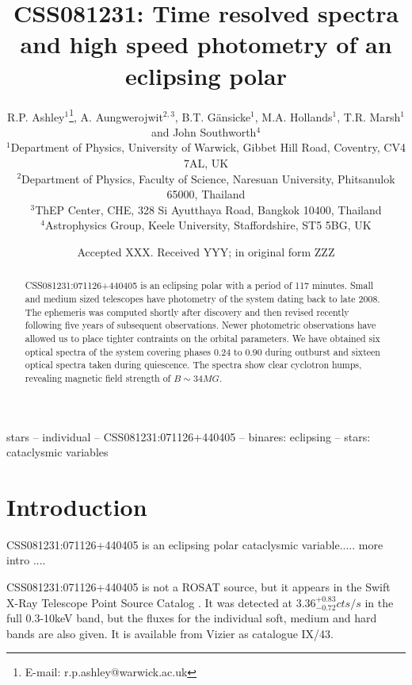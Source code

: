 \documentclass[a4paper,fleqn,usenatbib]{mnras}
\title[CSS081231]{CSS081231: Time resolved spectra and high speed photometry of an eclipsing polar}
\author[R.P. Ashley et al.]{
R.P. Ashley$^{1}$\thanks{E-mail: r.p.ashley@warwick.ac.uk},
A. Aungwerojwit$^{2, 3}$,
B.T. G{\"a}nsicke$^{1}$,
M.A. Hollands$^{1}$,
T.R. Marsh$^{1}$ and \newauthor
John Southworth$^{4}$
\\
$^{1}$Department of Physics, University of Warwick, Gibbet Hill Road, Coventry, CV4 7AL, UK\\
$^{2}$Department of Physics, Faculty of Science, Naresuan University, Phitsanulok 65000, Thailand\\
$^{3}$ThEP Center, CHE, 328 Si Ayutthaya Road, Bangkok 10400, Thailand\\
$^{4}$Astrophysics Group, Keele University, Staffordshire, ST5 5BG, UK
}
\date{Accepted XXX. Received YYY; in original form ZZZ}
\begin{document}
\label{firstpage}
\pagerange{\pageref{firstpage}--\pageref{lastpage}}
\maketitle

\begin{abstract}
CSS081231:071126+440405 is an eclipsing polar with a period of 117 minutes. Small and medium sized telescopes have photometry of the system dating back to late 2008. The ephemeris was computed shortly after discovery and then revised recently following five years of subsequent observations. Newer photometric observations have allowed us to place tighter contraints on the orbital parameters. We have obtained six optical spectra of the system covering phases 0.24 to 0.90 during outburst and sixteen optical spectra taken during quiescence. The spectra show clear cyclotron humps, revealing magnetic field strength of $B  \sim 34 MG$.
\end{abstract}

\begin{keywords}
stars -- individual -- CSS081231:071126+440405 -- binares: eclipsing -- stars: cataclysmic variables
\end{keywords}



\section{Introduction}
CSS081231:071126+440405 is an eclipsing polar cataclysmic variable..... more intro ....


CSS081231:071126+440405 is not a ROSAT source, but it appears in the Swift X-Ray Telescope Point Source Catalog \citep{2014ApJS..210....8E}. It was detected at $3.36 ^{+0.83} _{-0.72} cts/s$ in the full 0.3-10keV band, but the fluxes for the individual soft, medium and hard bands are also given. It is available from Vizier as catalogue IX/43.
\end{document}
